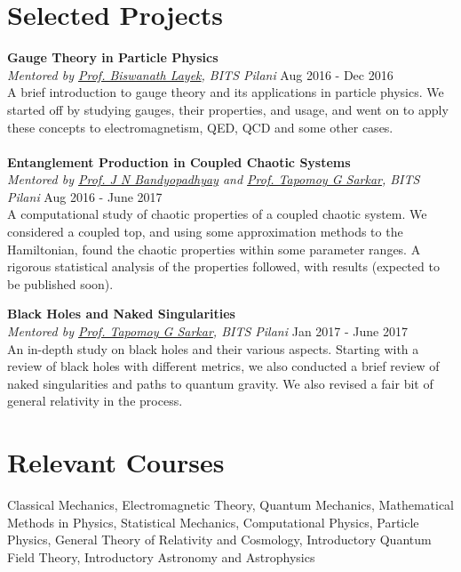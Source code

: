 \documentclass[margin, centered]{res}
\begin{document}
\begin{resume}
\section{Selected Projects}

\textbf{Gauge Theory in Particle Physics}\\
\emph{Mentored by \href{http://universe.bits-pilani.ac.in/pilani/layek/profile}{Prof. Biswanath Layek}, BITS Pilani} \hfill Aug 2016 - Dec 2016\\
A brief introduction to gauge theory and its applications in particle physics. We started off by studying gauges, their properties, and usage, and went on to apply these concepts to electromagnetism, QED, QCD and some other cases. \\
\\
\textbf{Entanglement Production in Coupled Chaotic Systems}\\
\emph{Mentored by \href{http://www.bits-pilani.ac.in/Pilani/jayendra/Profile}{Prof. J N Bandyopadhyay} and \href{http://www.bits-pilani.ac.in/Pilani/tapomoy/Profile}{Prof. Tapomoy G Sarkar}, BITS Pilani} \hfill Aug 2016 - June 2017\\
A computational study of chaotic properties of a coupled chaotic system. We considered a coupled top, and using some approximation methods to the Hamiltonian, found the chaotic properties within some parameter ranges. A rigorous statistical analysis of the properties followed, with results (expected to be published soon).

\textbf{Black Holes and Naked Singularities}\\
\emph{Mentored by \href{http://www.bits-pilani.ac.in/Pilani/tapomoy/Profile}{Prof. Tapomoy G Sarkar}, BITS Pilani} \hfill Jan 2017 - June 2017\\
An in-depth study on black holes and their various aspects. Starting with a review of black holes with different metrics, we also conducted a brief review of naked singularities and paths to quantum gravity. We also revised a fair bit of general relativity in the process.


\section{Relevant \hspace{2mm} Courses}
Classical Mechanics, Electromagnetic Theory, Quantum Mechanics, Mathematical Methods in Physics, Statistical Mechanics, Computational Physics, Particle Physics, General Theory of Relativity and Cosmology, Introductory Quantum Field Theory, Introductory Astronomy and Astrophysics


\end{resume}
\end{document}
